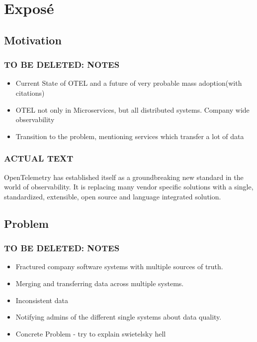 \chapter{Exposé}

\section{Motivation}

\subsection{TO BE DELETED: NOTES}

\begin{itemize}
	\item Current State of OTEL and a future of very probable mass adoption(with citations)
	\item OTEL not only in Microservices, but all distributed systems. Company wide observability
	\item Transition to the problem, mentioning services which transfer a lot of data
\end{itemize}

\subsection{ACTUAL TEXT}

OpenTelemetry has established itself as a groundbreaking new standard in the world of observability.
It is replacing many vendor specific solutions with a single, standardized, extensible, open source
and language integrated solution.

\section{Problem}

\subsection{TO BE DELETED: NOTES}

\begin{itemize}
	\item Fractured company software systems with multiple sources of truth.
	\item Merging and transferring data across multiple systems.
	\item Inconsistent data
	\item Notifying admins of the different single systems about data quality.
	\item Concrete Problem - try to explain swietelsky hell
\end{itemize}

